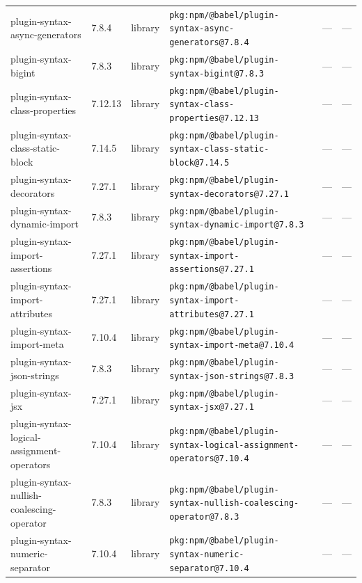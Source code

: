 \documentclass[11pt,a4paper]{article}
\begin{document}
\begin{longtable}{|p{4cm}|p{2cm}|p{1.6cm}|p{5cm}|p{1.5cm}|p{3.5cm}|}
\raggedright plugin-syntax-async-generators & 7.8.4 & library & \small\texttt{pkg:npm/@babel/plugin-syntax-async-generators@7.8.4} & — & \small — \\
\raggedright plugin-syntax-bigint & 7.8.3 & library & \small\texttt{pkg:npm/@babel/plugin-syntax-bigint@7.8.3} & — & \small — \\
\raggedright plugin-syntax-class-properties & 7.12.13 & library & \small\texttt{pkg:npm/@babel/plugin-syntax-class-properties@7.12.13} & — & \small — \\
\raggedright plugin-syntax-class-static-block & 7.14.5 & library & \small\texttt{pkg:npm/@babel/plugin-syntax-class-static-block@7.14.5} & — & \small — \\
\raggedright plugin-syntax-decorators & 7.27.1 & library & \small\texttt{pkg:npm/@babel/plugin-syntax-decorators@7.27.1} & — & \small — \\
\raggedright plugin-syntax-dynamic-import & 7.8.3 & library & \small\texttt{pkg:npm/@babel/plugin-syntax-dynamic-import@7.8.3} & — & \small — \\
\raggedright plugin-syntax-import-assertions & 7.27.1 & library & \small\texttt{pkg:npm/@babel/plugin-syntax-import-assertions@7.27.1} & — & \small — \\
\raggedright plugin-syntax-import-attributes & 7.27.1 & library & \small\texttt{pkg:npm/@babel/plugin-syntax-import-attributes@7.27.1} & — & \small — \\
\raggedright plugin-syntax-import-meta & 7.10.4 & library & \small\texttt{pkg:npm/@babel/plugin-syntax-import-meta@7.10.4} & — & \small — \\
\raggedright plugin-syntax-json-strings & 7.8.3 & library & \small\texttt{pkg:npm/@babel/plugin-syntax-json-strings@7.8.3} & — & \small — \\
\raggedright plugin-syntax-jsx & 7.27.1 & library & \small\texttt{pkg:npm/@babel/plugin-syntax-jsx@7.27.1} & — & \small — \\
\raggedright plugin-syntax-logical-assignment-operators & 7.10.4 & library & \small\texttt{pkg:npm/@babel/plugin-syntax-logical-assignment-operators@7.10.4} & — & \small — \\
\raggedright plugin-syntax-nullish-coalescing-operator & 7.8.3 & library & \small\texttt{pkg:npm/@babel/plugin-syntax-nullish-coalescing-operator@7.8.3} & — & \small — \\
\raggedright plugin-syntax-numeric-separator & 7.10.4 & library & \small\texttt{pkg:npm/@babel/plugin-syntax-numeric-separator@7.10.4} & — & \small — \\

\end{longtable}
\end{document}
